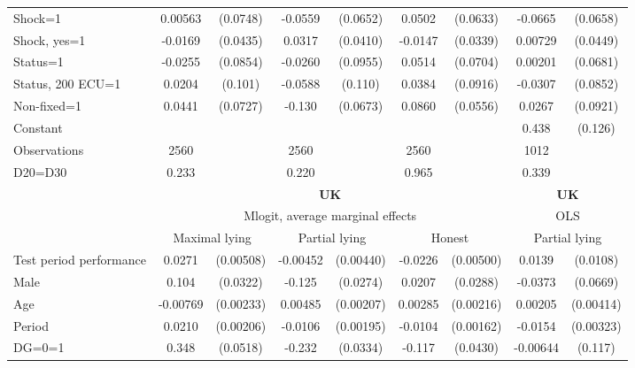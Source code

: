 \begin{tabular}{l|cccccc|cc}
Shock=1         &  0.00563         & (0.0748)&  -0.0559         & (0.0652)&   0.0502         & (0.0633)&  -0.0665         & (0.0658)\\
Shock, yes=1    &  -0.0169         & (0.0435)&   0.0317         & (0.0410)&  -0.0147         & (0.0339)&  0.00729         & (0.0449)\\
Status=1        &  -0.0255         & (0.0854)&  -0.0260         & (0.0955)&   0.0514         & (0.0704)&  0.00201         & (0.0681)\\
Status, 200 ECU=1&   0.0204         &  (0.101)&  -0.0588         &  (0.110)&   0.0384         & (0.0916)&  -0.0307         & (0.0852)\\
Non-fixed=1     &   0.0441         & (0.0727)&   -0.130\sym{*}  & (0.0673)&   0.0860         & (0.0556)&   0.0267         & (0.0921)\\
Constant        &                  &         &                  &         &                  &         &    0.438\sym{***}&  (0.126)\\
\hline
Observations    &     2560         &         &     2560         &         &     2560         &         &     1012         &         \\
D20=D30         &    0.233         &         &    0.220         &         &    0.965         &         &    0.339         &         \\
\hline\hline
&\multicolumn{6}{c|}{\bf UK}&\multicolumn{2}{c}{\bf UK}\\ &\multicolumn{6}{c|}{Mlogit, average marginal effects }&\multicolumn{2}{c}{OLS}\\
                &\multicolumn{2}{c}{Maximal lying}&\multicolumn{2}{c}{Partial lying}&\multicolumn{2}{c}{Honest}  &\multicolumn{2}{c}{Partial lying}\\
\hline
Test period performance&   0.0271\sym{***}&(0.00508)& -0.00452         &(0.00440)&  -0.0226\sym{***}&(0.00500)&   0.0139         & (0.0108)\\
Male            &    0.104\sym{***}& (0.0322)&   -0.125\sym{***}& (0.0274)&   0.0207         & (0.0288)&  -0.0373         & (0.0669)\\
Age             & -0.00769\sym{***}&(0.00233)&  0.00485\sym{**} &(0.00207)&  0.00285         &(0.00216)&  0.00205         &(0.00414)\\
Period          &   0.0210\sym{***}&(0.00206)&  -0.0106\sym{***}&(0.00195)&  -0.0104\sym{***}&(0.00162)&  -0.0154\sym{***}&(0.00323)\\
DG=0=1          &    0.348\sym{***}& (0.0518)&   -0.232\sym{***}& (0.0334)&   -0.117\sym{***}& (0.0430)& -0.00644         &  (0.117)\\

\end{tabular}
